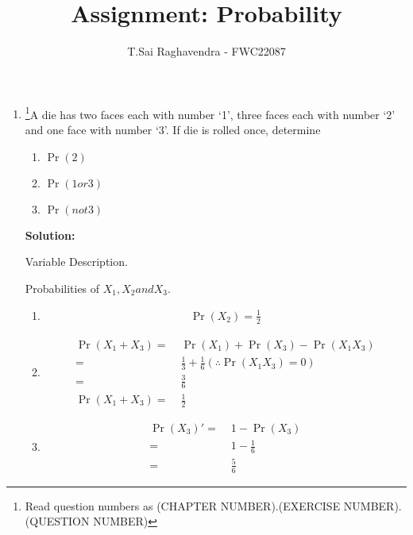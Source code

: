 \documentclass{article}
\providecommand{\pr}[1]{\ensuremath{\Pr\left(#1\right)}}
\newcommand{\solution}{\noindent \textbf{Solution: }}
\begin{document}
\title{Assignment: Probability}
\author{\Large T.Sai Raghavendra - FWC22087}
\date{}


\maketitle
\begin{enumerate}[label=16.\arabic{enumi}.\arabic{enumii}]%
\setcounter{enumi}{3}
\setcounter{enumii}{3}

\item \footnote{Read question numbers as (CHAPTER NUMBER).(EXERCISE NUMBER).(QUESTION NUMBER)}A die has two faces each with number ‘1’, three faces each with number ‘2’ and one face with number ‘3’. If die is rolled once, determine
\begin{enumerate}
\item \pr{2}
\item \pr{1 or 3}
\item \pr{not 3}
\end{enumerate}

\solution
	\begin{table}[h]
	
	\caption{Variable Description.}
	\label{tables:table1}
	\end{table}

	\begin{table}[h]
	\caption{Probabilities of $X_1,X_2 and X_3$.}
	\label{tables:table2}
	\end{table}

\begin{enumerate}
\item \begin{align}
\pr{X_2} = \frac{1}{2}  %
\end{align}	
\item 
\begin{align}
\pr{X_1 + X_3}	=& \; \pr{X_1} + \pr{X_3} - \pr{X_1X_3}\\
				=& \; \frac{1}{3} + \frac{1}{6}   (\therefore \pr{X_1X_3} = 0)\\
				=& \; \frac{3}{6}\\
\pr{X_1 + X_3} 	=& \; \frac{1}{2}
\end{align}
\item 
\begin{align}
\pr{X_3}\prime =& \;1 - \pr{X_3}\\
			   =& \;1 - \frac{1}{6}\\
			   =& \;\frac{5}{6}
\end{align}
\end{enumerate}
\end{enumerate}
\end{document}
